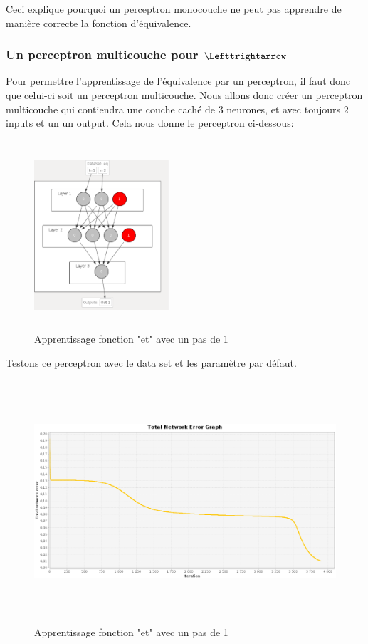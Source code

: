 \documentclass[twoside,openright,a4paper,11pt,french]{article}
\begin{document}

Ceci explique pourquoi un perceptron monocouche ne peut pas apprendre de manière correcte
la fonction d'équivalence.

\subsubsection{Un perceptron multicouche pour $ \Lefttrightarrow $}

Pour permettre l'apprentissage de l'équivalence par un perceptron, il faut donc que
celui-ci soit un perceptron multicouche.
Nous allons donc créer un perceptron multicouche qui contiendra une couche caché de
3 neurones, et avec toujours 2 inputs et un un output.
Cela nous donne le perceptron ci-dessous:

\begin{figure}[h]
\centering
\includegraphics[width=5cm,height=7cm]{./pics/eq/perceptron_multi.eps}
\caption{Apprentissage fonction "et" avec un pas de 1}
\label{fig:anderr4}
\end{figure}

Testons ce perceptron avec le data set et les paramètre par défaut.

\begin{figure}[h]
\centering
\includegraphics[width=12cm,height=9cm]{./pics/eq/multi_eq_def.eps}
\caption{Apprentissage fonction "et" avec un pas de 1}
\label{fig:anderr4}
\end{figure}
\end{document}
